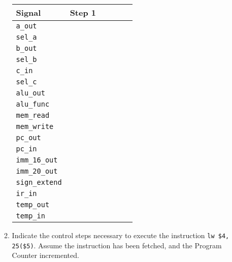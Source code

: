\documentclass[a4paper,10pt]{article}
\begin{document}
\begin{enumerate}
\begin{enumerate}
\begin{center}
\begin{tabular}{|l|p{1.2cm}|p{1.2cm}|p{1.2cm}|p{1.2cm}|p{1.2cm}|}
\hline
\textbf{Signal} & \textbf{Step 1} & & & & \\
\hline
\texttt{a\_out} & & & & & \\
\hline
\texttt{sel\_a} & & & & & \\
\hline
\texttt{b\_out} & & & & & \\
\hline
\texttt{sel\_b} & & & & & \\
\hline
\texttt{c\_in} & & & & & \\
\hline
\texttt{sel\_c} & & & & & \\
\hline
\texttt{alu\_out} & & & & & \\
\hline
\texttt{alu\_func} & & & & & \\
\hline
\texttt{mem\_read} & & & & & \\
\hline
\texttt{mem\_write} & & & & & \\
\hline
\texttt{pc\_out} & & & & & \\
\hline
\texttt{pc\_in} & & & & & \\
\hline
\texttt{imm\_16\_out} & & & & & \\
\hline
\texttt{imm\_20\_out} & & & & & \\
\hline
\texttt{sign\_extend} & & & & & \\
\hline
\texttt{ir\_in} & & & & & \\
\hline
\texttt{temp\_out} & & & & & \\
\hline
\texttt{temp\_in} & & & & & \\
\hline
\end{tabular}
\end{center}

\item Indicate the control steps necessary to execute the instruction \texttt{lw \$4, 25(\$5)}. Assume the instruction has been fetched,
and the Program Counter incremented.


\end{enumerate}
\end{enumerate}
\end{document}
